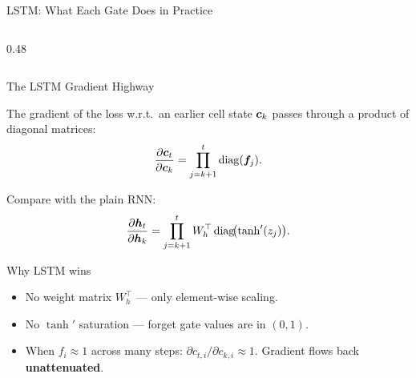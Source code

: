 \documentclass[aspectratio=169]{beamer}
\begin{document}
\begin{frame}{LSTM: What Each Gate Does in Practice}
\begin{columns}[T]
\begin{column}{0.48\textwidth}
\smallskip

\end{column}
\end{columns}
\end{frame}
%
%
\begin{frame}{The LSTM Gradient Highway}

The gradient of the loss w.r.t.\ an earlier cell state $\bm{c}_k$
passes through a product of diagonal matrices:
\[
\frac{\partial \bm{c}_t}{\partial \bm{c}_k}
  = \prod_{j=k+1}^{t} \operatorname{diag}(\bm{f}_j).
\]

Compare with the plain RNN:
\[
\frac{\partial \bm{h}_t}{\partial \bm{h}_k}
  = \prod_{j=k+1}^{t}
    W_h^\top \operatorname{diag}\!\bigl(\tanh'(z_j)\bigr).
\]
\vspace{-.3cm}
\begin{alertblock}{Why LSTM wins}
\begin{itemize}\setlength{\itemsep}{1pt}
\item No weight matrix $W_h^\top$ --- only element-wise scaling.
\item No $\tanh'$ saturation --- forget gate values are in $(0,1)$.
\item When $f_i \!\approx\! 1$ across many steps:
      $\partial c_{t,i}/\partial c_{k,i} \approx 1$.
      Gradient flows back \textbf{unattenuated}.
\end{itemize}
\end{alertblock}

\end{frame}
%
%
\end{document}
